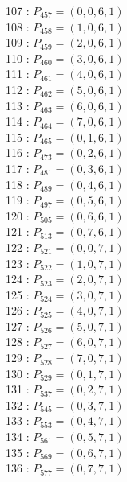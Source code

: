 \documentclass{article}
\begin{document}
{\begin{multicols}{3}
107 : $P_{457}=( 0, 0, 6, 1 )$\\
108 : $P_{458}=( 1, 0, 6, 1 )$\\
109 : $P_{459}=( 2, 0, 6, 1 )$\\
110 : $P_{460}=( 3, 0, 6, 1 )$\\
111 : $P_{461}=( 4, 0, 6, 1 )$\\
112 : $P_{462}=( 5, 0, 6, 1 )$\\
113 : $P_{463}=( 6, 0, 6, 1 )$\\
114 : $P_{464}=( 7, 0, 6, 1 )$\\
115 : $P_{465}=( 0, 1, 6, 1 )$\\
116 : $P_{473}=( 0, 2, 6, 1 )$\\
117 : $P_{481}=( 0, 3, 6, 1 )$\\
118 : $P_{489}=( 0, 4, 6, 1 )$\\
119 : $P_{497}=( 0, 5, 6, 1 )$\\
120 : $P_{505}=( 0, 6, 6, 1 )$\\
121 : $P_{513}=( 0, 7, 6, 1 )$\\
122 : $P_{521}=( 0, 0, 7, 1 )$\\
123 : $P_{522}=( 1, 0, 7, 1 )$\\
124 : $P_{523}=( 2, 0, 7, 1 )$\\
125 : $P_{524}=( 3, 0, 7, 1 )$\\
126 : $P_{525}=( 4, 0, 7, 1 )$\\
127 : $P_{526}=( 5, 0, 7, 1 )$\\
128 : $P_{527}=( 6, 0, 7, 1 )$\\
129 : $P_{528}=( 7, 0, 7, 1 )$\\
130 : $P_{529}=( 0, 1, 7, 1 )$\\
131 : $P_{537}=( 0, 2, 7, 1 )$\\
132 : $P_{545}=( 0, 3, 7, 1 )$\\
133 : $P_{553}=( 0, 4, 7, 1 )$\\
134 : $P_{561}=( 0, 5, 7, 1 )$\\
135 : $P_{569}=( 0, 6, 7, 1 )$\\
136 : $P_{577}=( 0, 7, 7, 1 )$\\
\end{multicols}


%


%


}%
\end{document}
